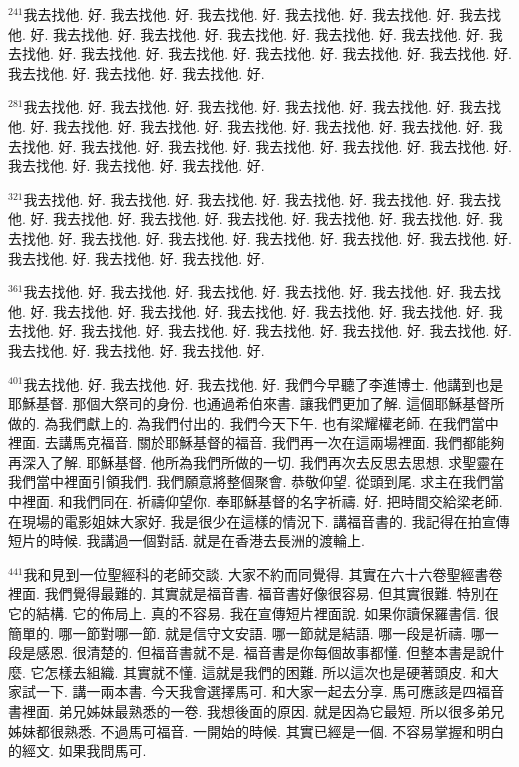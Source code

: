 \documentclass{book}
\begin{document}
$^{241}$我去找他.
好.
我去找他.
好.
我去找他.
好.
我去找他.
好.
我去找他.
好.
我去找他.
好.
我去找他.
好.
我去找他.
好.
我去找他.
好.
我去找他.
好.
我去找他.
好.
我去找他.
好.
我去找他.
好.
我去找他.
好.
我去找他.
好.
我去找他.
好.
我去找他.
好.
我去找他.
好.
我去找他.
好.
我去找他.
好.

$^{281}$我去找他.
好.
我去找他.
好.
我去找他.
好.
我去找他.
好.
我去找他.
好.
我去找他.
好.
我去找他.
好.
我去找他.
好.
我去找他.
好.
我去找他.
好.
我去找他.
好.
我去找他.
好.
我去找他.
好.
我去找他.
好.
我去找他.
好.
我去找他.
好.
我去找他.
好.
我去找他.
好.
我去找他.
好.
我去找他.
好.

$^{321}$我去找他.
好.
我去找他.
好.
我去找他.
好.
我去找他.
好.
我去找他.
好.
我去找他.
好.
我去找他.
好.
我去找他.
好.
我去找他.
好.
我去找他.
好.
我去找他.
好.
我去找他.
好.
我去找他.
好.
我去找他.
好.
我去找他.
好.
我去找他.
好.
我去找他.
好.
我去找他.
好.
我去找他.
好.
我去找他.
好.

$^{361}$我去找他.
好.
我去找他.
好.
我去找他.
好.
我去找他.
好.
我去找他.
好.
我去找他.
好.
我去找他.
好.
我去找他.
好.
我去找他.
好.
我去找他.
好.
我去找他.
好.
我去找他.
好.
我去找他.
好.
我去找他.
好.
我去找他.
好.
我去找他.
好.
我去找他.
好.
我去找他.
好.
我去找他.
好.
我去找他.
好.

$^{401}$我去找他.
好.
我去找他.
好.
我去找他.
好.
我們今早聽了李進博士.
他講到也是耶穌基督.
那個大祭司的身份.
也通過希伯來書.
讓我們更加了解.
這個耶穌基督所做的.
為我們獻上的.
為我們付出的.
我們今天下午.
也有梁耀權老師.
在我們當中裡面.
去講馬克福音.
關於耶穌基督的福音.
我們再一次在這兩場裡面.
我們都能夠再深入了解.
耶穌基督.
他所為我們所做的一切.
我們再次去反思去思想.
求聖靈在我們當中裡面引領我們.
我們願意將整個聚會.
恭敬仰望.
從頭到尾.
求主在我們當中裡面.
和我們同在.
祈禱仰望你.
奉耶穌基督的名字祈禱.
好.
把時間交給梁老師.
在現場的電影姐妹大家好.
我是很少在這樣的情況下.
講福音書的.
我記得在拍宣傳短片的時候.
我講過一個對話.
就是在香港去長洲的渡輪上.

$^{441}$我和見到一位聖經科的老師交談.
大家不約而同覺得.
其實在六十六卷聖經書卷裡面.
我們覺得最難的.
其實就是福音書.
福音書好像很容易.
但其實很難.
特別在它的結構.
它的佈局上.
真的不容易.
我在宣傳短片裡面說.
如果你讀保羅書信.
很簡單的.
哪一節對哪一節.
就是信守文安語.
哪一節就是結語.
哪一段是祈禱.
哪一段是感恩.
很清楚的.
但福音書就不是.
福音書是你每個故事都懂.
但整本書是說什麼.
它怎樣去組織.
其實就不懂.
這就是我們的困難.
所以這次也是硬著頭皮.
和大家試一下.
講一兩本書.
今天我會選擇馬可.
和大家一起去分享.
馬可應該是四福音書裡面.
弟兄姊妹最熟悉的一卷.
我想後面的原因.
就是因為它最短.
所以很多弟兄姊妹都很熟悉.
不過馬可福音.
一開始的時候.
其實已經是一個.
不容易掌握和明白的經文.
如果我問馬可.
\end{document}
